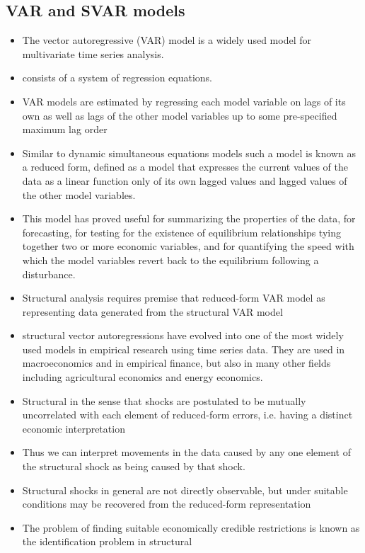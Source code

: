 \documentclass[]{scrartcl}
\begin{document}
\subsection{VAR and SVAR models}
\begin{itemize}
	\item The vector autoregressive (VAR) model is a widely used model for multivariate
 time series analysis. 
	\item consists of a system of regression equations.
	\item VAR models
 are estimated by regressing each model variable on lags of its own as well as
lags of the other model variables up to some pre-specified maximum lag order
	\item Similar to dynamic simultaneous equations models
such a model is known as a reduced form, defined as a model that expresses the
current values of the data as a linear function only of its own lagged values and lagged values of the other model variables. 
	\item This model
has proved useful for summarizing the properties of the data, for forecasting,
for testing for the existence of equilibrium relationships tying together two or
more economic variables, and for quantifying the speed with which the model
variables revert back to the equilibrium following a disturbance.
	\item Structural analysis requires premise that reduced-form VAR model as
	representing data generated from the structural VAR model
	\item  structural vector autoregressions have
evolved into one of the most widely used models in empirical research using time
series data. They are used in macroeconomics and in empirical finance, but also
	in many other fields including agricultural economics and energy economics.
	\item Structural in the sense that shocks are postulated to be mutually
	uncorrelated with each element of reduced-form errors, i.e. having a distinct economic interpretation
	\item Thus we can interpret movements in the data caused by any one
	element of the structural shock as being caused by that shock. 
	\item Structural shocks in general
are not directly observable, but under suitable conditions may be recovered from
the reduced-form representation
	\item The problem of finding suitable economically credible
restrictions is known as the identification problem in structural

\end{itemize}
\end{document}
